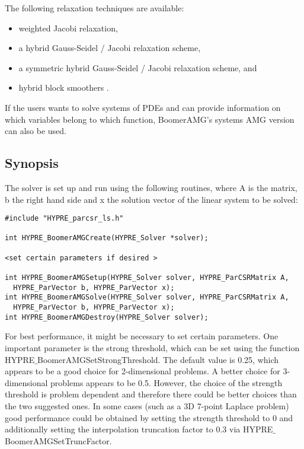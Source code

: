The following relaxation techniques are available:
\begin{itemize}
\item weighted Jacobi relaxation,
\item a hybrid Gauss-Seidel / Jacobi relaxation scheme, 
\item a symmetric hybrid Gauss-Seidel / Jacobi relaxation scheme, and
\item hybrid block smoothers \cite{UMYang_2004}.
\end{itemize}

If the users wants to solve systems of PDEs and can provide information on
which variables belong to which function, BoomerAMG's systems AMG version
can also be used.


\subsection{Synopsis}

The solver is set up and run using the following routines,
where A is the matrix, b the right hand side and x the solution vector
of the linear system to be solved:

\begin{display}
\begin{verbatim}
#include "HYPRE_parcsr_ls.h"

int HYPRE_BoomerAMGCreate(HYPRE_Solver *solver); 

<set certain parameters if desired >

int HYPRE_BoomerAMGSetup(HYPRE_Solver solver, HYPRE_ParCSRMatrix A,
  HYPRE_ParVector b, HYPRE_ParVector x);
int HYPRE_BoomerAMGSolve(HYPRE_Solver solver, HYPRE_ParCSRMatrix A,
  HYPRE_ParVector b, HYPRE_ParVector x);
int HYPRE_BoomerAMGDestroy(HYPRE_Solver solver);
\end{verbatim}
\end{display}


For best performance, it might be necessary to set certain parameters.
One important parameter is the strong threshold, which can be set
using the function HYPRE$\_$BoomerAMGSetStrongThreshold.
The default value is 0.25, which appears to be a good choice for 2-dimensional
problems. A better choice for 3-dimensional problems appears to be 0.5. However,
the choice of the strength threshold is problem dependent and therefore
there could be better choices than the two suggested ones.
In some cases (such as a 3D 7-point Laplace problem) good performance
could be obtained by setting the strength threshold to 0 and additionally
setting the interpolation truncation factor to 0.3 
via HYPRE$\_$BoomerAMGSetTruncFactor.

